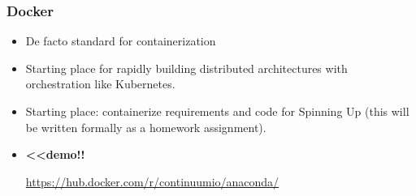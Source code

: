 \documentclass{beamer}
\begin{document}
\begin{frame}
  \frametitle{Docker}
  \begin{itemize}
  \item De facto standard for containerization
  \item Starting place for rapidly building distributed architectures with orchestration like
    Kubernetes.
  \item Starting place: containerize requirements and code for Spinning Up (this will be
    written formally as a homework assignment).
  \item {\bf <<demo!! }
    \begin{itemize}
      \url{https://hub.docker.com/r/continuumio/anaconda/}
    \end{itemize}
  \end{itemize}
\end{frame}
\end{document}
